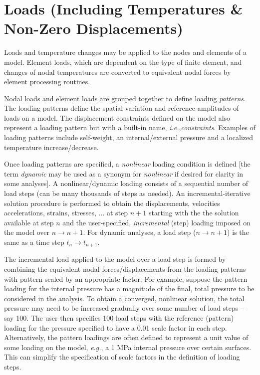 \documentclass[11pt]{report}
\numberwithin{equation}{section}
\newcommand{\eg}{\emph{e.g.},\xspace}
\newcommand{\ie}{\emph{i.e.},\xspace}
\newcommand{\ti}{\emph}
\begin{document}
\section{Loads (Including Temperatures \& Non-Zero Displacements)}

Loads and temperature changes may be applied to the nodes and elements of a model. 
Element loads, which are dependent on the type of finite element, and changes of nodal 
temperatures are converted to equivalent nodal forces by element processing routines. 

Nodal loads and element loads are grouped together to define loading \ti{patterns}. 
The loading patterns define the spatial variation and reference amplitudes of 
loads on a model. The displacement constraints defined on the model also represent 
a loading pattern but with a built-in
name, \ie \ti{constraints}. Examples of loading patterns include self-weight, an internal/external 
pressure and a localized temperature increase/decrease. 

Once loading patterns are specified, a \ti{nonlinear} loading condition is defined
[the term
\ti{dynamic} may be used as a synonym for \ti{nonlinear} if desired for clarity
in some analyses]. A nonlinear/dynamic loading
consists of a sequential number of load steps (can be many thousands of
steps as needed). An incremental-iterative solution procedure is performed
to obtain the displacements, velocities accelerations, strains, stresses, $\dots$ at
step $n+1$ starting with the the solution available at step $n$ and the user-specified,
\ti{incremental} (step) loading imposed on the model over $n \rightarrow n+1$.
For dynamic analyses, a load step ($n \rightarrow n+1$) is the same as a 
time step $t_n \rightarrow t_{n+1}$. 

The incremental load applied to the model over a load step
is formed by combining the equivalent nodal forces/displacements
from the loading patterns with pattern scaled by an
appropriate factor. For example,
suppose the pattern loading for the internal pressure has a magnitude of the
final, total pressure to be considered in the analysis.
To obtain a converged, nonlinear solution, the total pressure may need to be
increased gradually over some number of load steps -- say 100.  The
user then specifies 100 load steps with the reference (pattern)
loading for the pressure specified to have a 0.01 scale factor in 
each step. Alternatively, the pattern loadings are often defined to represent
a unit value of some loading on the model, \eg a 1 MPa internal
pressure over certain surfaces. This can simplify the specification of scale factors
in the definition of loading steps.
\end{document}
